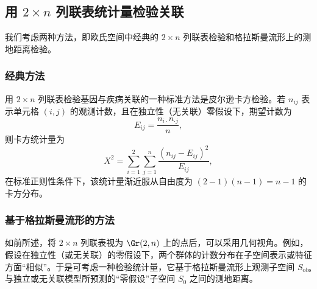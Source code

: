 \subsection{用 \texorpdfstring{$2\times n$}{2×n} 列联表统计量检验关联}

我们考虑两种方法，即欧氏空间中经典的 $2\times n$ 列联表检验和格拉斯曼流形上的测地距离检验。

\subsubsection{经典方法}

用 $2\times n$ 列联表检验基因与疾病关联的一种标准方法是皮尔逊卡方检验。若 $n_{ij}$ 表示单元格 $(i,j)$ 的观测计数，且在独立性（无关联）零假设下，期望计数为
\[
  E_{ij}=\frac{n_{i\cdot}n_{\cdot j}}{n},
\]
则卡方统计量为
\[
  X^2=\sum_{i=1}^2\sum_{j=1}^n\frac{(n_{ij}-E_{ij})^2}{E_{ij}},
\]
在标准正则性条件下，该统计量渐近服从自由度为 $(2-1)(n-1)=n-1$ 的卡方分布。

\subsubsection{基于格拉斯曼流形的方法}

如前所述，将 $2\times n$ 列联表视为 $\Gr(2,n)$ 上的点后，可以采用几何视角。例如，假设在独立性（或无关联）的零假设下，两个群体的计数分布在子空间表示或特征方面“相似”。于是可考虑一种检验统计量，它基于格拉斯曼流形上观测子空间 $S_{\mathrm{obs}}$ 与独立或无关联模型所预测的“零假设”子空间 $S_0$ 之间的测地距离。

